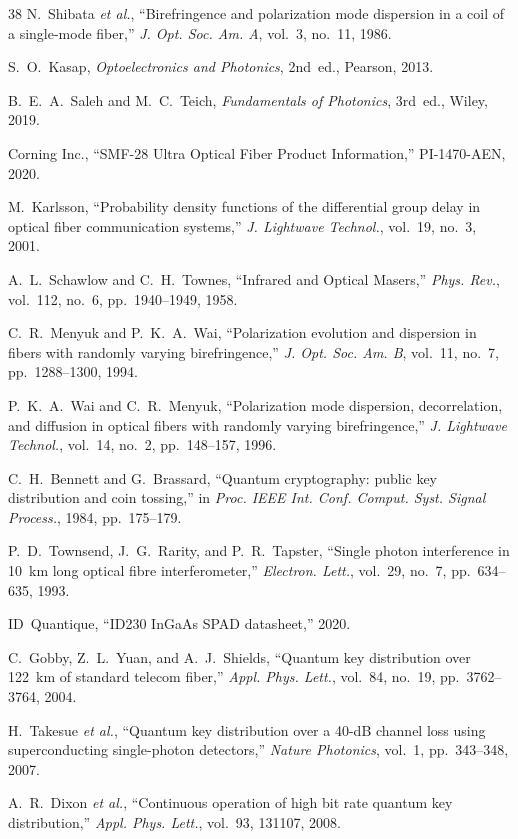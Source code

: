 \documentclass[3p,times,preprint]{elsarticle}
\begin{document}
\begin{thebibliography}{38}
N.~Shibata \textit{et al.}, ``Birefringence and polarization mode
dispersion in a coil of a single-mode fiber,'' \textit{J. Opt. Soc. Am. A},
vol.~3, no.~11, 1986.

S.~O.~Kasap, \textit{Optoelectronics and Photonics}, 2nd~ed., Pearson,
2013.

B.~E.~A.~Saleh and M.~C.~Teich, \textit{Fundamentals of Photonics},
3rd~ed., Wiley, 2019.

Corning Inc., ``SMF-28 Ultra Optical Fiber Product Information,''
PI-1470-AEN, 2020.

M.~Karlsson, ``Probability density functions of the differential group
delay in optical fiber communication systems,'' \textit{J. Lightwave
Technol.}, vol.~19, no.~3, 2001.

A.~L.~Schawlow and C.~H.~Townes, ``Infrared and Optical Masers,''
\textit{Phys. Rev.}, vol.~112, no.~6, pp.~1940--1949, 1958.

C.~R.~Menyuk and P.~K.~A.~Wai, ``Polarization evolution and dispersion
in fibers with randomly varying birefringence,'' \textit{J. Opt. Soc.
Am. B}, vol.~11, no.~7, pp.~1288--1300, 1994.

P.~K.~A.~Wai and C.~R.~Menyuk, ``Polarization mode dispersion,
decorrelation, and diffusion in optical fibers with randomly varying
birefringence,'' \textit{J. Lightwave Technol.}, vol.~14, no.~2,
pp.~148--157, 1996.

C.~H.~Bennett and G.~Brassard, ``Quantum cryptography: public key
distribution and coin tossing,'' in \textit{Proc. IEEE Int. Conf.
Comput. Syst. Signal Process.}, 1984, pp.~175--179.

P.~D.~Townsend, J.~G.~Rarity, and P.~R.~Tapster, ``Single photon
interference in 10~km long optical fibre interferometer,''
\textit{Electron. Lett.}, vol.~29, no.~7, pp.~634--635, 1993.

ID~Quantique, ``ID230 InGaAs SPAD datasheet,'' 2020.

C.~Gobby, Z.~L.~Yuan, and A.~J.~Shields, ``Quantum key distribution
over 122~km of standard telecom fiber,'' \textit{Appl. Phys. Lett.},
vol.~84, no.~19, pp.~3762--3764, 2004.

H.~Takesue \textit{et al.}, ``Quantum key distribution over a 40-dB
channel loss using superconducting single-photon detectors,''
\textit{Nature Photonics}, vol.~1, pp.~343--348, 2007.

A.~R.~Dixon \textit{et al.}, ``Continuous operation of high bit rate
quantum key distribution,'' \textit{Appl. Phys. Lett.}, vol.~93,
131107, 2008.

\end{thebibliography}
\end{document}
